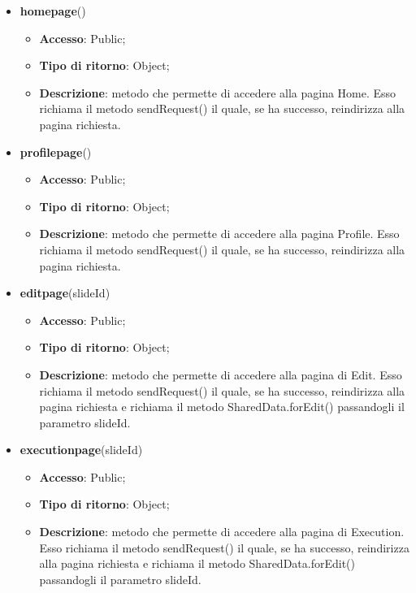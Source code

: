 {\begin{itemize}
\begin{itemize}
				\item \textbf{Accesso}: Public;
				\item \textbf{Tipo di ritorno}: Object;
				\item \textbf{Descrizione}: metodo che permette di accedere alla pagina di Registrazione. Esso richiama il metodo sendRequest() il quale, se ha successo, reindirizza alla pagina richiesta.
			\end{itemize}
			\item \textbf{homepage}()
			\begin{itemize}
				\item \textbf{Accesso}: Public;
				\item \textbf{Tipo di ritorno}: Object;
				\item \textbf{Descrizione}: metodo che permette di accedere alla pagina Home. Esso richiama il metodo sendRequest() il quale, se ha successo, reindirizza alla pagina richiesta.
			\end{itemize}
			\item \textbf{profilepage}()
			\begin{itemize}
				\item \textbf{Accesso}: Public;
				\item \textbf{Tipo di ritorno}: Object;
				\item \textbf{Descrizione}: metodo che permette di accedere alla pagina Profile. Esso richiama il metodo sendRequest() il quale, se ha successo, reindirizza alla pagina richiesta.
			\end{itemize}
			\item \textbf{editpage}(slideId)
			\begin{itemize}
				\item \textbf{Accesso}: Public;
				\item \textbf{Tipo di ritorno}: Object;
				\item \textbf{Descrizione}: metodo che permette di accedere alla pagina di Edit. Esso richiama il metodo sendRequest() il quale, se ha successo, reindirizza alla pagina richiesta e richiama il metodo SharedData.forEdit() passandogli il parametro slideId.
			\end{itemize}
			\item \textbf{executionpage}(slideId)
			\begin{itemize}
				\item \textbf{Accesso}: Public;
				\item \textbf{Tipo di ritorno}: Object;
				\item \textbf{Descrizione}: metodo che permette di accedere alla pagina di Execution. Esso richiama il metodo sendRequest() il quale, se ha successo, reindirizza alla pagina richiesta e richiama il metodo SharedData.forEdit() passandogli il parametro slideId.
			\end{itemize}
		\end{itemize} 
}

